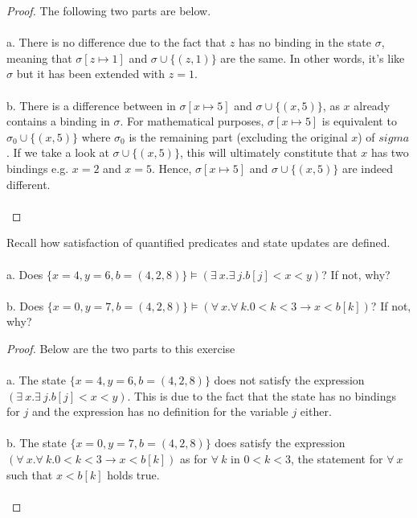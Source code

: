 \documentclass[12pt]{article}
\newenvironment{exercise}[2][Exercise]{\begin{trivlist}
\item[\hskip \labelsep {\bfseries #1}\hskip \labelsep {\bfseries #2.}]}{\end{trivlist}}
\begin{document}
\begin{proof}
The following two parts are below. \\ \\
a. There is no difference due to the fact that $z$ has no binding in the state $\sigma$, meaning that $\sigma [z \mapsto 1]$ and $\sigma \cup \{(z, 1)\}$ are the same. In other words, it's like $\sigma$ but it has been extended with $z = 1$. \\ \\ 
b. There is a difference between in $\sigma [x \mapsto 5]$ and $\sigma \cup \{(x, 5)\}$, as $x$ already contains a binding in $\sigma$. For mathematical purposes, $\sigma [x \mapsto 5]$ is equivalent to $\sigma_{0} \cup \{(x,5)\}$ where $\sigma_{0}$ is the remaining part (excluding the original $x$) of $sigma$. If we take a look at $\sigma \cup \{(x,5)\}$, this will ultimately constitute that $x$ has two bindings e.g. $x = 2$ and $x = 5$. Hence, $\sigma [x \mapsto 5]$ and $\sigma \cup \{(x, 5)\}$ are indeed different. \\ \\
\end{proof}

\begin{exercise}{7}
Recall how satisfaction of quantified predicates and state updates are defined. \\ \\
a. Does $\{x = 4, y = 6, b = (4,2,8)\} \models (\exists\: x. \exists\: j. b[j] < x < y)$? If not, why? \\ \\ 
b. Does $\{x = 0, y = 7, b = (4,2,8)\} \models (\forall\: x. \forall\: k. 0 < k < 3 \rightarrow x < b[k])$? If not, why? 
\end{exercise}

\begin{proof}
Below are the two parts to this exercise \\ \\
a. The state $\{x = 4, y = 6, b = (4,2,8)\}$ does not satisfy the expression $(\exists\: x. \exists\: j. b[j] < x < y)$. This is due to the fact that the state has no bindings for $j$ and the expression has no definition for the variable $j$ either. \\ \\ 
b. The state $\{x = 0, y = 7, b = (4,2,8)\}$ does satisfy the expression $(\forall\: x. \forall\: k. 0 < k < 3 \rightarrow x < b[k])$ as for $\forall\: k$ in $0 < k < 3$, the statement for $\forall\: x$ such that $x < b[k]$ holds true. \\ \\
\end{proof}
\end{document}
